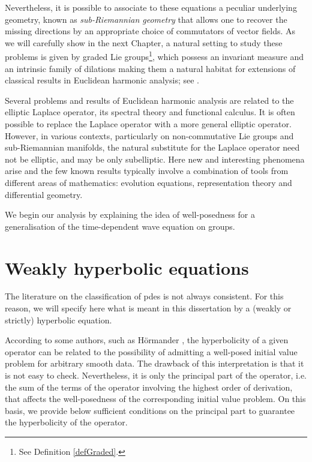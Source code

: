 \documentclass[12pt,oneside,a4paper]{book}
\numberwithin{equation}{section}     %
\theoremstyle{plain}
\theoremstyle{definition}
\begin{document}
Nevertheless, it is possible to associate to these equations a peculiar underlying geometry, known as \textit{sub-Riemannian geometry} that allows one to recover the missing directions by an appropriate choice of commutators of vector fields. As we will carefully show in the next Chapter, a natural setting to study these problems is given by graded Lie groups\footnote{See Definition \ref{defGraded}.}, which possess an invariant measure and an intrinsic family of dilations making them a natural habitat for extensions of classical results in Euclidean harmonic analysis; see \cite{FS}. 

Several problems and results of Euclidean harmonic analysis are related to the elliptic Laplace operator, its spectral theory and functional calculus. It is often possible to replace the Laplace operator with a more general elliptic operator. However, in various contexts, particularly on non-commutative Lie groups and sub-Riemannian manifolds, the natural substitute for the Laplace operator need not be elliptic, and may be only subelliptic. Here new and interesting phenomena arise and the few known results typically involve a combination of tools from different areas of mathematics: evolution equations, representation theory and differential geometry.

We begin our analysis by explaining the idea of well-posedness for a generalisation of the time-dependent wave equation on groups.

\section{Weakly hyperbolic equations}
The literature on the classification of pdes is not always consistent. For this reason, we will specify here what is meant in this dissertation by a (weakly or strictly) hyperbolic equation. 

According to some authors, such as H\"ormander \cite{H1990}, the hyperbolicity of a given operator can be related to the possibility of admitting a well-posed initial value problem for arbitrary smooth data. The drawback of this interpretation is that it is not easy to check. Nevertheless, it is only the principal part of the operator, i.e. the sum of the terms of the operator involving the highest order of derivation, that affects the well-posedness of the corresponding initial value problem. On this basis, we provide below sufficient conditions on the principal part to guarantee  the hyperbolicity of the operator.
\end{document}
